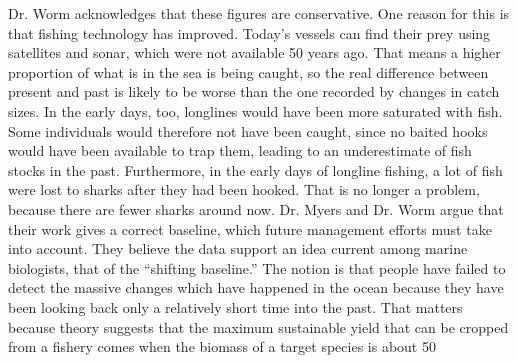 Dr. Worm acknowledges that these figures are conservative. One reason for this is that fishing technology has improved. Today’s vessels can find their prey using satellites and sonar, which were not available 50 years ago. That means a higher proportion of what is in the sea is being caught, so the real difference between present and past is likely to be worse than the one recorded by changes in catch sizes. In the early days, too, longlines would have been more saturated with fish. Some individuals would therefore not have been caught, since no baited hooks would have been available to trap them, leading to an underestimate of fish stocks in the past. Furthermore, in the early days of longline fishing, a lot of fish were lost to sharks after they had been hooked. That is no longer a problem, because there are fewer sharks around now.
Dr. Myers and Dr. Worm argue that their work gives a correct baseline, which future management efforts must take into account. They believe the data support an idea current among marine biologists, that of the “shifting baseline.” The notion is that people have failed to detect the massive changes which have happened in the ocean because they have been looking back only a relatively short time into the past. That matters because theory suggests that the maximum sustainable yield that can be cropped from a fishery comes when the biomass of a target species is about 50%

